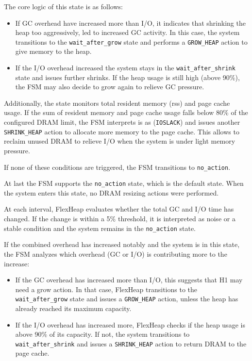 The core logic of this state is as follows:
\begin{itemize}

	\item
	      If GC overhead have increased more than I/O, it indicates that shrinking the heap too aggressively,
	      led to increased GC activity. In this case, the system transitions to the \texttt{wait\_after\_grow} state
	      and performs a \texttt{GROW\_HEAP} action to give memory to the heap.

	\item If the I/O overhead increased the system stays in the \texttt{wait\_after\_shrink} state and issues further shrinks.
	      If the heap usage is still high (above 90\%), the FSM may also decide to grow again to relieve GC pressure.
\end{itemize}

Additionally, the state monitors total resident memory (rss) and page cache
usage. If the sum of resident memory and page cache usage falls below 80\% of
the configured DRAM limit, the FSM interprets is as (\texttt{IOSLACK}) and
issues another \texttt{SHRINK\_HEAP} action to allocate more memory to the page
cache. This allows to reclaim unused DRAM to relieve I/O when the system is
under light memory pressure.

If none of these conditions are triggered, the FSM
transitions to \texttt{no\_action}.

At last the FSM supports the \texttt{no\_action} state, which is the default state.
When the system enters this state, no DRAM resizing actions were performed.

At each interval, FlexHeap evaluates whether the total GC and I/O time has
changed. If the change is within a 5\% threshold, it is interpreted
as noise or a stable condition and the system remains in the \texttt{no\_action} state.

If the combined overhead has increased notably and the system is in this state, the FSM analyzes which overhead (GC or I/O) is
contributing more to the increase:
\begin{itemize}
	\item If the GC overhead has increased more than I/O, this suggests that H1 may need a grow action.
	      In that case, FlexHeap transitions to the \texttt{wait\_after\_grow} state and issues a \texttt{GROW\_HEAP} action,
	      unless the heap has already reached its maximum capacity.

	\item If the I/O overhead has increased more, FlexHeap checks if the heap usage is above 90\% of
	      its capacity. If not, the system transitions to \texttt{wait\_after\_shrink} and issues a \texttt{SHRINK\_HEAP}
	      action to return DRAM to the page cache.
\end{itemize}

